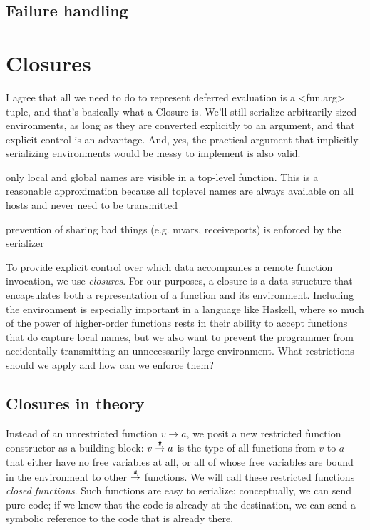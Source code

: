 \documentclass[preprint]{sigplanconf}
\begin{document}
\subsection{Failure handling}

\section{Closures}
I agree that all we need to do to represent deferred evaluation is a
<fun,arg> tuple, and that's basically what a Closure is. We'll still
serialize arbitrarily-sized environments, as long as they are
converted explicitly to an argument, and that explicit control is an
advantage. And, yes, the practical argument that implicitly
serializing environments would be messy to implement is also valid.

only local and global names are visible in a top-level function. This is a reasonable approximation because all toplevel names are always available on all hosts and never need to be transmitted

prevention of sharing bad things (e.g. mvars, receiveports) is enforced by the serializer

To provide explicit control over which data accompanies a remote function invocation, we use {\em closures}. For our purposes, a closure is a data structure that encapsulates both a representation of a function and its environment. Including the environment is especially important in a language like Haskell, where so much of the power of higher-order functions rests in their ability to accept functions that do capture local names, but we also want to prevent the programmer from accidentally transmitting an unnecessarily large environment. What restrictions should we apply and how can we enforce them?

\subsection{Closures in theory}

Instead of an unrestricted function $v \rightarrow a$, we posit a new restricted function constructor as a building-block: $v \stackrel{\texttt{\#}}{\rightarrow} a$ is the type of all functions from $v$ to $a$ that either have no free variables at all, or all of whose free variables are bound in the environment to other $\stackrel{\texttt{\#}}{\rightarrow}$ functions. We will call these restricted functions {\em closed functions}. Such functions are easy to serialize; conceptually, we can send pure code; if we know that the code is already at the destination, we can send a symbolic reference to the code that is already there.  
\end{document}
